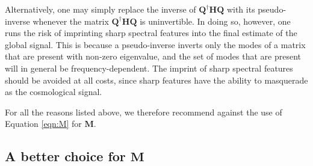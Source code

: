 \documentclass[twocolumn,apj,numberedappendix]{emulateapj}
\newcommand{\Hmat}{\mathbf{H}}
\newcommand{\Q}{\mathbf{Q}}
\newcommand{\M}{\mathbf{M}}
\newcommand{\acl}[1]{{\color{red} \textbf{[ACL:  #1]}}}
\begin{document}
Alternatively, one may simply replace the inverse of $\Q^\dagger \Hmat \Q$ with its pseudo-inverse whenever the matrix $\Q^\dagger \Hmat \Q$ is uninvertible. In doing so, however, one runs the risk of imprinting sharp spectral features into the final estimate of the global signal. This is because a pseudo-inverse inverts only the modes of a matrix that are present with non-zero eigenvalue, and the set of modes that are present will in general be frequency-dependent. The imprint of sharp spectral features should be avoided at all costs, since sharp features have the ability to masquerade as the cosmological signal.

For all the reasons listed above, we therefore recommend against the use of Equation \eqref{eqn:M} for $\M$. 
%



\subsection{A better choice for $\M$}
\label{sec:BetterM}
\end{document}
